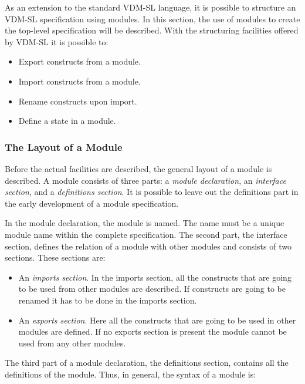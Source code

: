\documentclass{overturerepchap}
\begin{document}
{As an extension to the standard VDM-SL language, it is possible to
structure an  VDM-SL specification using modules. In this section,
the use of modules to create the top-level specification will be described.
With the structuring facilities offered by  VDM-SL it is possible to:
\begin{itemize}
\item Export constructs from a module.
\item Import constructs from a module.
\item Rename constructs upon import.
\item Define a state in a module.
\end{itemize}


\subsubsection{The Layout of a Module}

Before the actual facilities are described, the general layout of a
module is described. A module consists of three parts: a {\it module
declaration}, an {\it interface section}, and a {\it definitions
section}. It is possible to leave out the definitions part in the
early development of a module specification.

In the module declaration, the module is named. The name must be a
unique module name within the complete specification. The second
part, the interface section, defines the relation of a module with other
modules and consists of two sections. These sections are:
\begin{itemize}

\item An {\it imports section}. In the imports section, all the
  constructs that are going to be used from other modules are
  described. If constructs are going to be renamed it has to be done
  in the imports section.

\item An {\it exports section}. Here all the constructs that are going
  to be used in other modules are defined.
  If no exports section is present the
  module cannot be used from any other modules.
\end{itemize}
The third part of a module declaration, the
definitions section, contains all the definitions of the module.
Thus, in general, the syntax of a module is:


}
\end{document}
